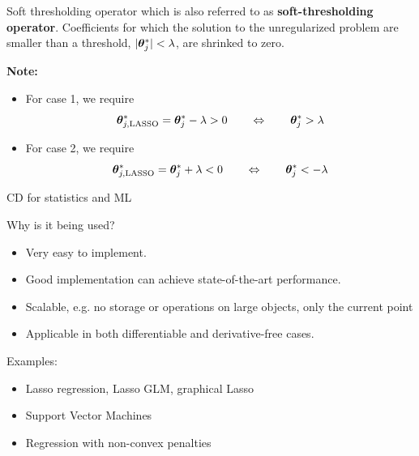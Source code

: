 \documentclass[11pt,compress,t,notes=noshow, xcolor=table]{beamer}
\begin{document}
\begin{vbframe}{Soft thresholding operator}
which is also referred to as \textbf{soft-thresholding operator}. Coefficients for which the solution to the unregularized problem are smaller than a threshold, $|\bm{\theta}^\ast_j| < \lambda$, are shrinked to zero. 

\vspace*{0.2cm}

\begin{footnotesize}
\textbf{Note: }
\begin{itemize}
    \item For case 1, we require 
    $$
        \bm{\theta}^\ast_{j, \text{LASSO}} = \bm{\theta}^\ast_j - \lambda  > 0 \qquad \Leftrightarrow \qquad \bm{\theta}^\ast_j > \lambda 
    $$
    \item For case 2, we require
    $$
        \bm{\theta}^\ast_{j, \text{LASSO}} = \bm{\theta}^\ast_j + \lambda  < 0 \qquad \Leftrightarrow \qquad \bm{\theta}^\ast_j < - \lambda 
    $$
\end{itemize}
\end{footnotesize}

\end{vbframe}


\begin{vbframe}{CD for statistics and ML}

Why is it being used?

\begin{itemize}
\item Very easy to implement.
\item Good implementation can achieve state-of-the-art performance.
\item Scalable, e.g. no storage or operations on large objects,
  only the current point
\item Applicable in both differentiable and derivative-free cases.
\end{itemize}

\lz 

Examples:

\begin{itemize}
\item Lasso regression, Lasso GLM, graphical Lasso
\item Support Vector Machines
\item Regression with non-convex penalties
\end{itemize}




\end{vbframe}


\endlecture
\end{document}
